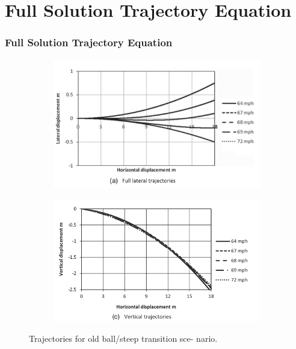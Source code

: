\documentclass{beamer}
\begin{document}
\section{Full Solution Trajectory Equation}
\begin{frame}
\frametitle{Full Solution Trajectory Equation}

\begin{figure}[h!]
  \centering
  \begin{subfigure}[b]{0.5\linewidth}
    \includegraphics[width=\linewidth]{./figs/fs_9.png}
  \end{subfigure}
  \begin{subfigure}[b]{0.5\linewidth}
    \includegraphics[width=\linewidth]{./figs/fs_8.png}
  \end{subfigure}
  \caption{Trajectories for old ball/steep transition sce-
nario.}
  \label{fig:fs89}
\end{figure}
\end{frame}
\end{document}
